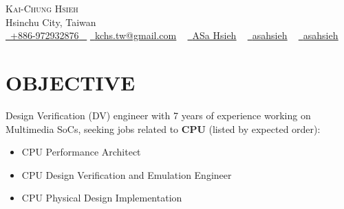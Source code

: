 \documentclass[letterpaper,11pt]{article}
\newcommand{\resumeItem}[1]{
  \item\small{
    {#1 \vspace{-0.5pt}}
  }
}
\newcommand{\resumeItemListStart}{\begin{itemize}}
\newcommand{\resumeItemListEnd}{\end{itemize}\vspace{-5pt}}
\begin{document}


\begin{center}
    {\Huge \scshape Kai-Chung Hsieh} \\ \vspace{1pt}
    Hsinchu City, Taiwan \\ \vspace{1pt}
    \small \href{tel:+886972932876}{ \raisebox{-0.1\height}\faPhone\ \underline{+886-972932876} ~} \href{mailto:kchs.tw@gmail.com}{\raisebox{-0.2\height}\faGoogle\  \underline{kchs.tw@gmail.com}} ~ 
    \href{https://linkedin.com/in/asa-hsieh}{\raisebox{-0.2\height}\faLinkedinSquare\ \underline{ASa Hsieh}}  ~
    \href{https://github.com/asahsieh}{\raisebox{-0.2\height}\faGithub\ \underline{asahsieh}} ~
    \href{https://hackmd.io/@asahsieh}{\raisebox{-0.2\height}\faBook\ \underline{asahsieh}} ~
    \vspace{-8pt}
\end{center}
 

\section{OBJECTIVE}
    {Design Verification (DV) engineer with 7 years of experience working on Multimedia SoCs, seeking jobs related to \textbf{CPU} (listed by expected order):}
        \resumeItemListStart
            \resumeItem{\normalsize{CPU Performance Architect}}
            \vspace{-5pt}
            \resumeItem{\normalsize{CPU Design Verification and Emulation Engineer}}
             \vspace{-5pt}
            \resumeItem{\normalsize{CPU Physical Design Implementation}}
        \resumeItemListEnd
    \vspace{-6pt}
     
\end{document}

